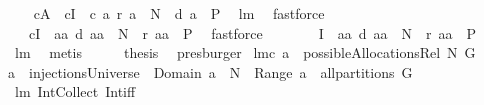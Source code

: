 \begin{isabellebody}
\ \ \isamarkupfalse%
\ {\isachardoublequoteopen}{\isacharquery}c{\isacharbackquote}{\isacharquery}A\ {\isacharequal}\ {\isacharparenleft}{\isacharquery}c{\isacharbackquote}{\isacharquery}I{\isacharparenright}\ {\isasyminter}\ {\isacharquery}c{\isacharbackquote}\ {\isacharparenleft}{\isacharbraceleft}a{\isachardot}\ {\isacharquery}r\ a\ {\isasymsubseteq}\ N\ {\isacharampersand}\ {\isacharquery}d\ a\ {\isasymin}\ {\isacharquery}P{\isacharbraceright}{\isacharparenright}{\isachardoublequoteclose}\ \isamarkupfalse%
\ lm{}{}\ \isamarkupfalse%
\ fastforce\isanewline
\ \ \isamarkupfalse%
\ \isamarkupfalse%
\ {\isachardoublequoteopen}{\isachardot}{\isachardot}{\isachardot}\ {\isacharequal}\ {\isacharparenleft}{\isacharquery}c{\isacharbackquote}{\isacharquery}I{\isacharparenright}\ {\isasyminter}\ {\isacharbraceleft}aa{\isachardot}\ {\isacharquery}d\ aa\ {\isasymsubseteq}\ N\ {\isacharampersand}\ {\isacharquery}r\ aa\ {\isasymin}\ {\isacharquery}P{\isacharbraceright}{\isachardoublequoteclose}\ \isamarkupfalse%
\ fastforce\isanewline
\ \ \isamarkupfalse%
\ \isamarkupfalse%
\ {\isachardoublequoteopen}{\isachardot}{\isachardot}{\isachardot}\ {\isacharequal}\ {\isacharquery}I\ {\isasyminter}\ {\isacharbraceleft}aa{\isachardot}\ {\isacharquery}d\ aa\ {\isasymsubseteq}\ N\ {\isacharampersand}\ {\isacharquery}r\ aa\ {\isasymin}\ {\isacharquery}P{\isacharbraceright}{\isachardoublequoteclose}\ \isamarkupfalse%
\ lm{}{}\ \isamarkupfalse%
\ metis\isanewline
\ \ \isamarkupfalse%
\ \isamarkupfalse%
\ {\isacharquery}thesis\ \isamarkupfalse%
\ presburger\isanewline
{}\isamarkupfalse%
%
\endisatagproof
{\isafoldproof}%
%
\isadelimproof
\isanewline
%
\endisadelimproof
\isanewline
{}\isamarkupfalse%
\ lm{}{}c{\isacharcolon}\ {\isachardoublequoteopen}a\ {\isasymin}\ possibleAllocationsRel\ N\ G\ {\isacharequal}\ \isanewline
{\isacharparenleft}a\ {\isasymin}\ injectionsUniverse\ {\isacharampersand}\ Domain\ a\ {\isasymsubseteq}\ N\ {\isacharampersand}\ Range\ a\ {\isasymin}\ all{\isacharunderscore}partitions\ G{\isacharparenright}{\isachardoublequoteclose}\ \isanewline
%
\isadelimproof
%
\endisadelimproof
%
\isatagproof
{}\isamarkupfalse%
\ lm{}{}\ Int{\isacharunderscore}Collect\ Int{\isacharunderscore}iff\ \isamarkupfalse%

\end{isabellebody}
